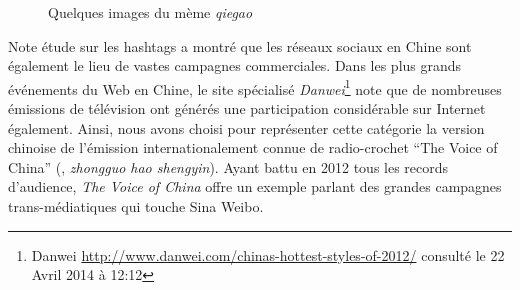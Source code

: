 \begin{figure}[h!]
    \centering
    \caption{
      Quelques images du mème \textit{qiegao}
    }
\end{figure}

Note étude sur les hashtags a montré que les réseaux sociaux en Chine sont également le lieu de vastes campagnes commerciales. Dans les plus  grands événements du Web en Chine, le site spécialisé \textit{Danwei}\footnote{ Danwei \url{http://www.danwei.com/chinas-hottest-styles-of-2012/} consulté le 22 Avril 2014 à 12:12} note que de nombreuses émissions de télévision ont générés une participation considérable sur Internet également. Ainsi, nous avons choisi pour représenter cette catégorie la version chinoise de l'émission internationalement connue de radio-crochet ``The Voice of China'' (, \textit{zhongguo hao shengyin}). Ayant battu en 2012 tous les records d'audience, \textit{The Voice of China} offre un exemple parlant des grandes campagnes trans-médiatiques qui touche Sina Weibo.

